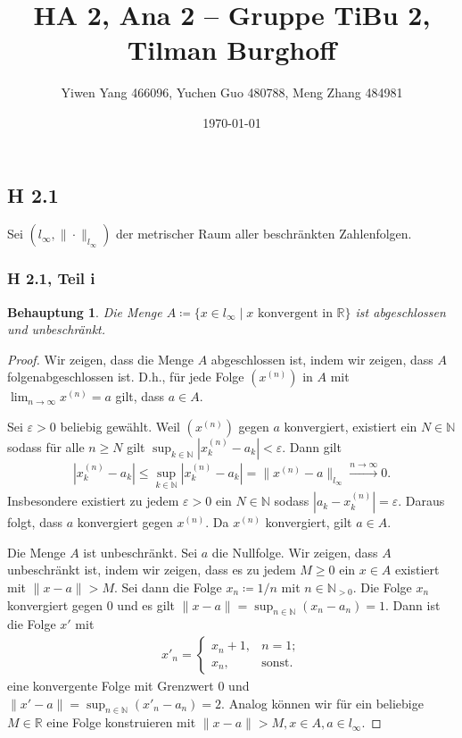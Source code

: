 \documentclass[draft,a5paper]{article}
\author{Yiwen Yang 466096, Yuchen Guo 480788, Meng Zhang 484981}
\date{\today}
\title{HA 2, Ana 2 -- Gruppe TiBu 2, Tilman Burghoff}
\newtheorem*{beh}{Behauptung}
\begin{document}
\maketitle

\newpage

\subsection*{H 2.1}

Sei \((l_{\infty}, \| \cdot \|_{l_{\infty}})\) der metrischer Raum aller beschränkten
Zahlenfolgen.

\subsubsection*{H 2.1, Teil i}

\begin{beh}
  Die Menge \(A \coloneq \{x \in l_{\infty} \mid x \text{ konvergent in } \mathbb{R}\}\) ist
  abgeschlossen und unbeschränkt.
\end{beh}

\begin{proof}
  Wir zeigen, dass die Menge \(A\) abgeschlossen ist, indem wir
  zeigen, dass \(A\) folgenabgeschlossen ist. D.h., für jede Folge
  \((x^{(n)})\) in \(A\) mit \(\lim_{n \to \infty}{x^{(n)}} = a\) gilt, dass
  \(a \in A\).

  Sei \(\varepsilon > 0\) beliebig gewählt.  Weil \((x^{(n)})\) gegen
  \(a\) konvergiert, existiert ein \(N \in \mathbb{N}\) sodass für alle \(n \ge N\)
  gilt \(\sup_{k \in \mathbb{N}}{|x_{k}^{(n)} - a_{k}|} < \varepsilon\).  Dann gilt
  \begin{align*}
    |x_{k}^{(n)} - a_{k}| \le \sup_{k \in \mathbb{N}}{|x_{k}^{(n)} - a_{k}|} =
    \|x^{(n)} - a\|_{l_{\infty}} \stackrel{n \to \infty}{\to} 0.
  \end{align*}
  Insbesondere existiert zu jedem \(\varepsilon > 0\) ein
  \(N \in \mathbb{N}\) sodass \(|a_{k} - x_{k}^{(n)}| = \varepsilon\).  Daraus folgt, dass
  \(a\) konvergiert gegen \(x^{(n)}\).  Da \(x^{(n)}\) konvergiert,
  gilt \(a \in A\).

  Die Menge \(A\) ist unbeschränkt.  Sei \(a\) die Nullfolge.  Wir
  zeigen, dass \(A\) unbeschränkt ist, indem wir zeigen, dass es zu
  jedem \(M \ge 0\) ein \(x \in A\) existiert mit \(\|x - a\| > M\).  Sei
  dann die Folge \(x_{n} \coloneq 1/n\) mit
  \(n \in \mathbb{N}_{> 0}\).  Die Folge \(x_{n}\) konvergiert gegen
  \(0\) und es gilt
  \(\|x - a\| = \sup_{n \in \mathbb{N}}{(x_{n} - a_{n})} = 1\).  Dann ist die Folge
  \(x'\) mit
  \begin{align*}
    x'_{n} =
    \begin{cases}
      x_{n} + 1, & n = 1; \\
      x_{n}, & \text{sonst.}
    \end{cases}
  \end{align*}
  eine konvergente Folge mit Grenzwert \(0\) und
  \(\|x' - a\| = \sup_{n \in \mathbb{N}}{(x'_{n} - a_{n})} = 2\).  Analog können wir
  für ein beliebige \(M \in \mathbb{R}\) eine Folge konstruieren mit
  \(\|x - a\| > M, x \in A, a \in l_{\infty}\).
\end{proof}
\end{document}
